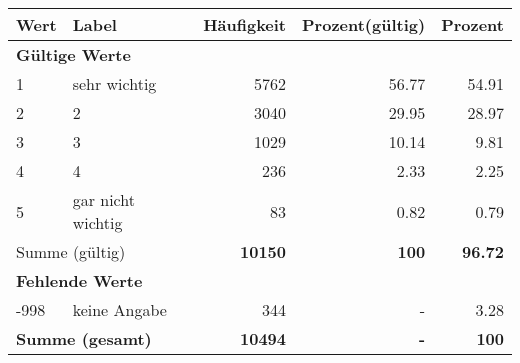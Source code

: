      \begin{longtable}{lXrrr}
     \toprule
     \textbf{Wert} & \textbf{Label} & \textbf{Häufigkeit} & \textbf{Prozent(gültig)} & \textbf{Prozent} \\
     \endhead
     \midrule
     \multicolumn{5}{l}{\textbf{Gültige Werte}}\\

     1 &
     \multicolumn{1}{X}{ sehr wichtig   } &


       \num{5762} &
       \num[round-mode=places,round-precision=2]{56,77} &
         \num[round-mode=places,round-precision=2]{54,91} \\

     2 &
     \multicolumn{1}{X}{ 2   } &


       \num{3040} &
       \num[round-mode=places,round-precision=2]{29,95} &
         \num[round-mode=places,round-precision=2]{28,97} \\

     3 &
     \multicolumn{1}{X}{ 3   } &


       \num{1029} &
       \num[round-mode=places,round-precision=2]{10,14} &
         \num[round-mode=places,round-precision=2]{9,81} \\

     4 &
     \multicolumn{1}{X}{ 4   } &


       \num{236} &
       \num[round-mode=places,round-precision=2]{2,33} &
         \num[round-mode=places,round-precision=2]{2,25} \\

     5 &
     \multicolumn{1}{X}{ gar nicht wichtig   } &


       \num{83} &
       \num[round-mode=places,round-precision=2]{0,82} &
         \num[round-mode=places,round-precision=2]{0,79} \\
     \midrule
     \multicolumn{2}{l}{Summe (gültig)} &
       \textbf{\num{10150}} &
     \textbf{100} &
       \textbf{\num[round-mode=places,round-precision=2]{96,72}} \\
     \multicolumn{5}{l}{\textbf{Fehlende Werte}}\\
       -998 &
       keine Angabe &
         \num{344} &
        - &
         \num[round-mode=places,round-precision=2]{3,28} \\
     \midrule
     \multicolumn{2}{l}{\textbf{Summe (gesamt)}} &
          \textbf{\num{10494}} &
        \textbf{-} &
        \textbf{100} \\
     \bottomrule
     \end{longtable}
     
